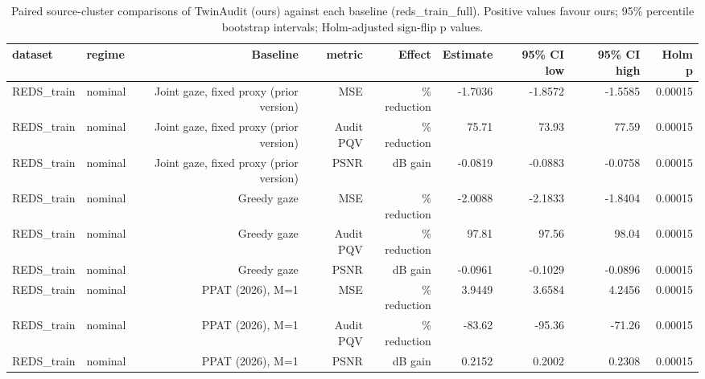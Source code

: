 \begin{table}[t]
\centering
\caption{Paired source-cluster comparisons of TwinAudit (ours) against each baseline (reds\_train\_full). Positive values favour ours; 95\% percentile bootstrap intervals; Holm-adjusted sign-flip p values.}
\label{tab:paired_reds_train_full}
\small
\begin{tabular}{llrrrrrrr}
\toprule
dataset & regime & Baseline & metric & Effect & Estimate & 95\% CI low & 95\% CI high & Holm p \\
\midrule
REDS\_train & nominal & Joint gaze, fixed proxy (prior version) & MSE & \% reduction & -1.7036 & -1.8572 & -1.5585 & 0.00015 \\
REDS\_train & nominal & Joint gaze, fixed proxy (prior version) & Audit PQV & \% reduction & 75.71 & 73.93 & 77.59 & 0.00015 \\
REDS\_train & nominal & Joint gaze, fixed proxy (prior version) & PSNR & dB gain & -0.0819 & -0.0883 & -0.0758 & 0.00015 \\
REDS\_train & nominal & Greedy gaze & MSE & \% reduction & -2.0088 & -2.1833 & -1.8404 & 0.00015 \\
REDS\_train & nominal & Greedy gaze & Audit PQV & \% reduction & 97.81 & 97.56 & 98.04 & 0.00015 \\
REDS\_train & nominal & Greedy gaze & PSNR & dB gain & -0.0961 & -0.1029 & -0.0896 & 0.00015 \\
REDS\_train & nominal & PPAT (2026), M=1 & MSE & \% reduction & 3.9449 & 3.6584 & 4.2456 & 0.00015 \\
REDS\_train & nominal & PPAT (2026), M=1 & Audit PQV & \% reduction & -83.62 & -95.36 & -71.26 & 0.00015 \\
REDS\_train & nominal & PPAT (2026), M=1 & PSNR & dB gain & 0.2152 & 0.2002 & 0.2308 & 0.00015 \\
\bottomrule
\end{tabular}
\end{table}
